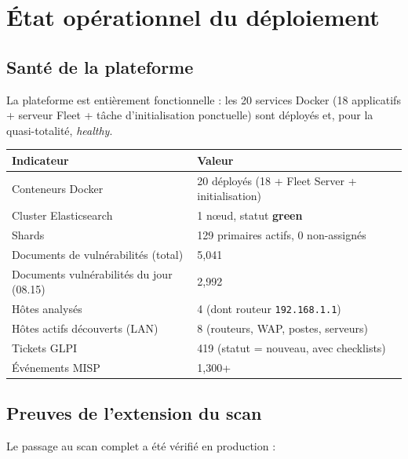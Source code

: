 \documentclass[11pt,a4paper]{article}
\begin{document}
\section{\'Etat op\'erationnel du d\'eploiement}

\subsection{Sant\'e de la plateforme}

La plateforme est enti\`erement fonctionnelle : les 20 services Docker
(18 applicatifs + serveur Fleet + t\^ache d'initialisation ponctuelle) sont
d\'eploy\'es et, pour la quasi-totalit\'e, \emph{healthy}.

\begin{center}
\small
\begin{tabularx}{\linewidth}{@{}l X@{}}
\toprule
\textbf{Indicateur} & \textbf{Valeur} \\
\midrule
Conteneurs Docker & 20 d\'eploy\'es (18 + Fleet Server + initialisation) \\
Cluster Elasticsearch & 1 n\oe ud, statut \textcolor{vocgreen}{\textbf{green}} \\
Shards & 129 primaires actifs, 0 non-assign\'es \\
Documents de vuln\'erabilit\'es (total) & 5{,}041 \\
Documents vuln\'erabilit\'es du jour (08.15) & 2{,}992 \\
H\^otes analys\'es & 4 (dont routeur \texttt{192.168.1.1}) \\
H\^otes actifs d\'ecouverts (LAN) & 8 (routeurs, WAP, postes, serveurs) \\
Tickets GLPI & 419 (statut = nouveau, avec checklists) \\
\'Ev\'enements MISP & 1{,}300+ \\
\bottomrule
\end{tabularx}
\end{center}

\subsection{Preuves de l'extension du scan}

Le passage au scan complet a \'et\'e v\'erifi\'e en production :
\end{document}
